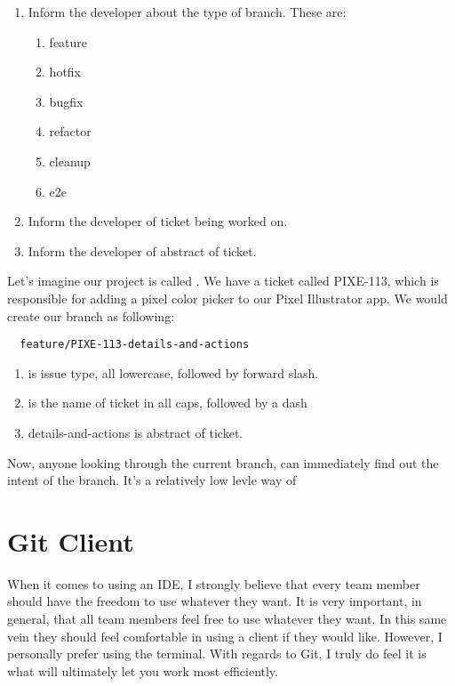 \begin{enumerate}
  \item Inform the developer about the type of branch. These are:
    \begin{enumerate}
      \item feature
      \item hotfix
      \item bugfix
      \item refactor
      \item cleanup
      \item e2e
    \end{enumerate}
  \item Inform the developer of ticket being worked on.
  \item Inform the developer of abstract of ticket.
\end{enumerate}

Let's imagine our project is called . We have a ticket called PIXE-113, which is responsible for adding a pixel color picker to our Pixel Illustrator app. We would create our branch as following:

\begin{verbatim}
  feature/PIXE-113-details-and-actions
\end{verbatim}

\begin{enumerate}
  \item {} is issue type, all lowercase, followed by forward slash.
  \item {} is the name of ticket in all caps, followed by a dash
  \item details-and-actions is abstract of ticket.
\end{enumerate}

Now, anyone looking through the current branch, can immediately find out the intent of the branch. It's a relatively low levle way of 

\section { Git Client }
When it comes to using an IDE, I strongly believe that every team member should
have the freedom to use whatever they want. It is very important, in general,
that all team members feel free to use whatever they want. In this same vein
they should feel comfortable in using a client if they would like. However, I personally prefer using the terminal. With regards to Git, I truly do feel it is what will ultimately let you work most efficiently.

